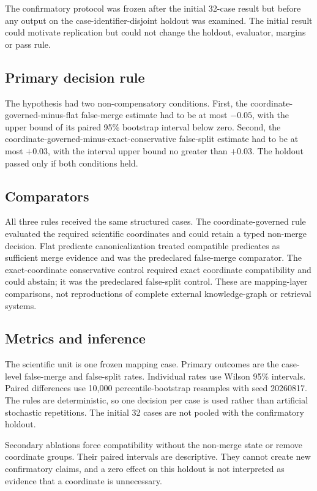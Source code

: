The confirmatory protocol was frozen after the initial 32-case result but
before any output on the case-identifier-disjoint holdout was examined. The initial result
could motivate replication but could not change the holdout, evaluator,
margins or pass rule.

\subsection{Primary decision rule}

The hypothesis had two non-compensatory conditions. First, the
coordinate-governed-minus-flat false-merge estimate had to be at most $-0.05$,
with the upper bound of its paired 95\% bootstrap interval below zero. Second,
the coordinate-governed-minus-exact-conservative false-split estimate had to be
at most $+0.03$, with the interval upper bound no greater than $+0.03$. The
holdout passed only if both conditions held.

\subsection{Comparators}

All three rules received the same structured cases. The coordinate-governed
rule evaluated the required scientific coordinates and could retain a typed
non-merge decision. Flat predicate canonicalization treated compatible
predicates as sufficient merge evidence and was the predeclared false-merge
comparator. The exact-coordinate conservative control required exact
coordinate compatibility and could abstain; it was the predeclared
false-split control. These are mapping-layer comparisons, not reproductions of
complete external knowledge-graph or retrieval systems.

\subsection{Metrics and inference}

The scientific unit is one frozen mapping case. Primary outcomes are the
case-level false-merge and false-split rates. Individual rates use Wilson 95\%
intervals. Paired differences use 10,000 percentile-bootstrap resamples with
seed 20260817. The rules are deterministic, so one decision per case is used
rather than artificial stochastic repetitions. The initial 32 cases are not
pooled with the confirmatory holdout.

Secondary ablations force compatibility without the non-merge state or remove
coordinate groups. Their paired intervals are descriptive. They cannot create
new confirmatory claims, and a zero effect on this holdout is not interpreted as
evidence that a coordinate is unnecessary.

